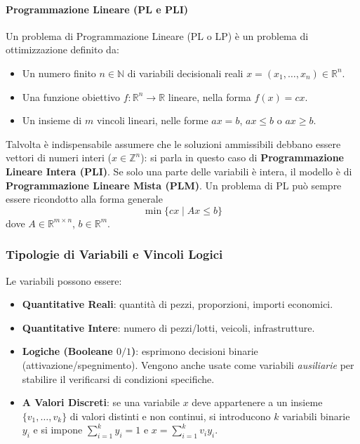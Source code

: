 \documentclass[12pt]{extarticle} %
\begin{document}
\paragraph{Programmazione Lineare (PL e PLI)}
Un problema di Programmazione Lineare (PL o LP) è un problema di ottimizzazione definito da:
\begin{itemize}
    \item Un numero finito $n \in \mathbb{N}$ di variabili decisionali reali $x=(x_1, \dots, x_n) \in \mathbb{R}^n$.
    \item Una funzione obiettivo $f: \mathbb{R}^n \to \mathbb{R}$ lineare, nella forma $f(x) = cx$.
    \item Un insieme di $m$ vincoli lineari, nelle forme $ax = b$, $ax \le b$ o $ax \ge b$.
\end{itemize}
Talvolta è indispensabile assumere che le soluzioni ammissibili debbano essere vettori di numeri interi ($x \in \mathbb{Z}^n$): si parla in questo caso di \textbf{Programmazione Lineare Intera (PLI)}. Se solo una parte delle variabili è intera, il modello è di \textbf{Programmazione Lineare Mista (PLM)}.
Un problema di PL può sempre essere ricondotto alla forma generale $$\min \{cx \mid Ax \le b\}$$dove $A\in\mathbb{R}^{m\times n}$, $b\in\mathbb{R}^m$.

\subsubsection{Tipologie di Variabili e Vincoli Logici}
Le variabili possono essere:
\begin{itemize}
    \item \textbf{Quantitative Reali}: quantità di pezzi, proporzioni, importi economici.
    \item \textbf{Quantitative Intere}: numero di pezzi/lotti, veicoli, infrastrutture.
    \item \textbf{Logiche (Booleane $0/1$)}: esprimono decisioni binarie (attivazione/spegnimento). Vengono anche usate come variabili \textit{ausiliarie} per stabilire il verificarsi di condizioni specifiche.
    \item \textbf{A Valori Discreti}: se una variabile $x$ deve appartenere a un insieme $\{v_1, \dots, v_k\}$ di valori distinti e non continui, si introducono $k$ variabili binarie $y_i$ e si impone $\sum_{i=1}^k y_i = 1$ e $x = \sum_{i=1}^k v_i y_i$.
\end{itemize}
\end{document}

